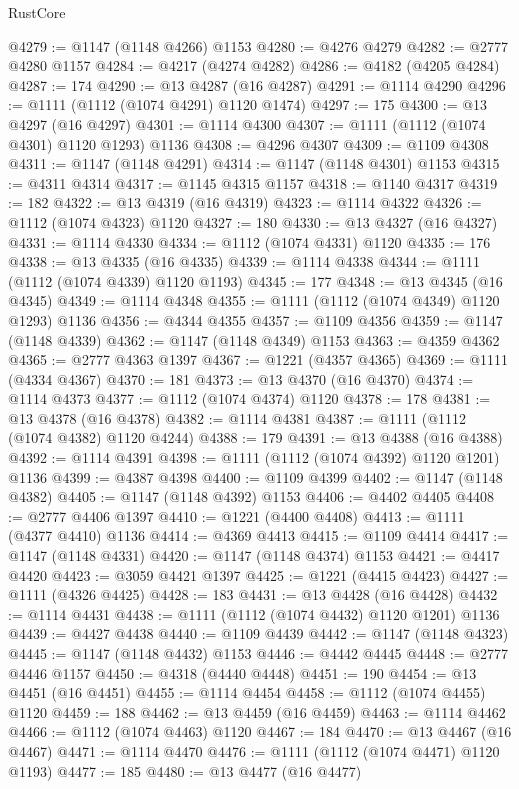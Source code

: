\begin{lexlean}{RustCore}
\begin{coremodule}
@4279 := @1147 (@1148 @4266) @1153
@4280 := @4276 @4279
@4282 := @2777 @4280 @1157
@4284 := @4217 (@4274 @4282)
@4286 := @4182 (@4205 @4284)
@4287 := 174
@4290 := @13 @4287 (@16 @4287)
@4291 := @1114 @4290
@4296 := @1111 (@1112 (@1074 @4291) @1120 @1474)
@4297 := 175
@4300 := @13 @4297 (@16 @4297)
@4301 := @1114 @4300
@4307 := @1111 (@1112 (@1074 @4301) @1120 @1293) @1136
@4308 := @4296 @4307
@4309 := @1109 @4308
@4311 := @1147 (@1148 @4291)
@4314 := @1147 (@1148 @4301) @1153
@4315 := @4311 @4314
@4317 := @1145 @4315 @1157
@4318 := @1140 @4317
@4319 := 182
@4322 := @13 @4319 (@16 @4319)
@4323 := @1114 @4322
@4326 := @1112 (@1074 @4323) @1120
@4327 := 180
@4330 := @13 @4327 (@16 @4327)
@4331 := @1114 @4330
@4334 := @1112 (@1074 @4331) @1120
@4335 := 176
@4338 := @13 @4335 (@16 @4335)
@4339 := @1114 @4338
@4344 := @1111 (@1112 (@1074 @4339) @1120 @1193)
@4345 := 177
@4348 := @13 @4345 (@16 @4345)
@4349 := @1114 @4348
@4355 := @1111 (@1112 (@1074 @4349) @1120 @1293) @1136
@4356 := @4344 @4355
@4357 := @1109 @4356
@4359 := @1147 (@1148 @4339)
@4362 := @1147 (@1148 @4349) @1153
@4363 := @4359 @4362
@4365 := @2777 @4363 @1397
@4367 := @1221 (@4357 @4365)
@4369 := @1111 (@4334 @4367)
@4370 := 181
@4373 := @13 @4370 (@16 @4370)
@4374 := @1114 @4373
@4377 := @1112 (@1074 @4374) @1120
@4378 := 178
@4381 := @13 @4378 (@16 @4378)
@4382 := @1114 @4381
@4387 := @1111 (@1112 (@1074 @4382) @1120 @4244)
@4388 := 179
@4391 := @13 @4388 (@16 @4388)
@4392 := @1114 @4391
@4398 := @1111 (@1112 (@1074 @4392) @1120 @1201) @1136
@4399 := @4387 @4398
@4400 := @1109 @4399
@4402 := @1147 (@1148 @4382)
@4405 := @1147 (@1148 @4392) @1153
@4406 := @4402 @4405
@4408 := @2777 @4406 @1397
@4410 := @1221 (@4400 @4408)
@4413 := @1111 (@4377 @4410) @1136
@4414 := @4369 @4413
@4415 := @1109 @4414
@4417 := @1147 (@1148 @4331)
@4420 := @1147 (@1148 @4374) @1153
@4421 := @4417 @4420
@4423 := @3059 @4421 @1397
@4425 := @1221 (@4415 @4423)
@4427 := @1111 (@4326 @4425)
@4428 := 183
@4431 := @13 @4428 (@16 @4428)
@4432 := @1114 @4431
@4438 := @1111 (@1112 (@1074 @4432) @1120 @1201) @1136
@4439 := @4427 @4438
@4440 := @1109 @4439
@4442 := @1147 (@1148 @4323)
@4445 := @1147 (@1148 @4432) @1153
@4446 := @4442 @4445
@4448 := @2777 @4446 @1157
@4450 := @4318 (@4440 @4448)
@4451 := 190
@4454 := @13 @4451 (@16 @4451)
@4455 := @1114 @4454
@4458 := @1112 (@1074 @4455) @1120
@4459 := 188
@4462 := @13 @4459 (@16 @4459)
@4463 := @1114 @4462
@4466 := @1112 (@1074 @4463) @1120
@4467 := 184
@4470 := @13 @4467 (@16 @4467)
@4471 := @1114 @4470
@4476 := @1111 (@1112 (@1074 @4471) @1120 @1193)
@4477 := 185
@4480 := @13 @4477 (@16 @4477)

\end{coremodule}
\end{lexlean}
